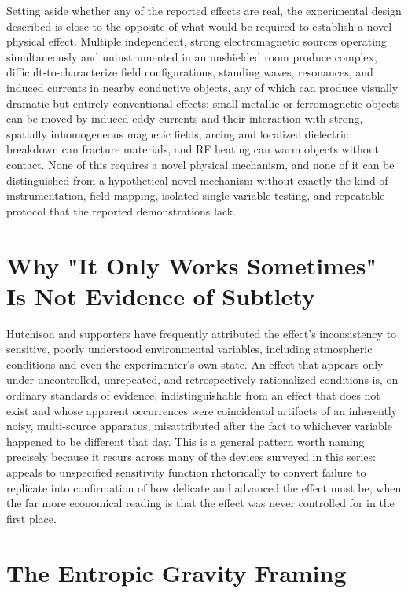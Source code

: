 \documentclass[11pt]{article}
\begin{document}
Setting aside whether any of the reported effects are real, the experimental design described is close to the opposite of what would be required to establish a novel physical effect. Multiple independent, strong electromagnetic sources operating simultaneously and uninstrumented in an unshielded room produce complex, difficult-to-characterize field configurations, standing waves, resonances, and induced currents in nearby conductive objects, any of which can produce visually dramatic but entirely conventional effects: small metallic or ferromagnetic objects can be moved by induced eddy currents and their interaction with strong, spatially inhomogeneous magnetic fields, arcing and localized dielectric breakdown can fracture materials, and RF heating can warm objects without contact. None of this requires a novel physical mechanism, and none of it can be distinguished from a hypothetical novel mechanism without exactly the kind of instrumentation, field mapping, isolated single-variable testing, and repeatable protocol that the reported demonstrations lack.

\section{Why "It Only Works Sometimes" Is Not Evidence of Subtlety}

Hutchison and supporters have frequently attributed the effect's inconsistency to sensitive, poorly understood environmental variables, including atmospheric conditions and even the experimenter's own state. An effect that appears only under uncontrolled, unrepeated, and retrospectively rationalized conditions is, on ordinary standards of evidence, indistinguishable from an effect that does not exist and whose apparent occurrences were coincidental artifacts of an inherently noisy, multi-source apparatus, misattributed after the fact to whichever variable happened to be different that day. This is a general pattern worth naming precisely because it recurs across many of the devices surveyed in this series: appeals to unspecified sensitivity function rhetorically to convert failure to replicate into confirmation of how delicate and advanced the effect must be, when the far more economical reading is that the effect was never controlled for in the first place.

\section{The Entropic Gravity Framing}
\end{document}
